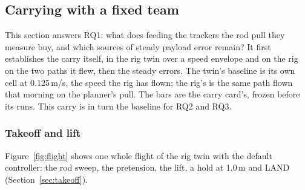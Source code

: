 
\subsection{Carrying with a fixed team}
\label{sec:res_carry}

This section answers RQ1: what does feeding the trackers the rod pull they measure buy, and which sources of steady
payload error remain? It first establishes the carry itself, in the rig twin over a speed envelope and on the rig on
the two paths it flew, then the steady errors. The twin's baseline is its own cell at 0.125\,m/s, the speed the rig
has flown; the rig's is the same path flown that morning on the planner's pull. The bars are the carry card's,
frozen before its runs. This carry is in turn the baseline for RQ2 and RQ3.

\subsubsection{Takeoff and lift}

Figure~\ref{fig:flight} shows one whole flight of the rig twin with the default controller: the rod sweep, the
pretension, the lift, a hold at 1.0\,m and LAND (Section~\ref{sec:takeoff}).

